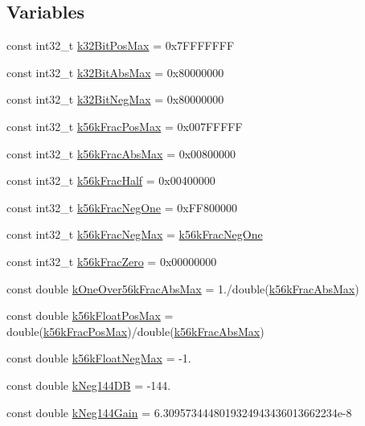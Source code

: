 \subsection*{Variables}
\begin{DoxyCompactItemize}
\item 
const int32\+\_\+t \hyperlink{a00181_a6758dcc7fe73efcefb9980ff895c36d0}{k32\+Bit\+Pos\+Max} = 0x7\+F\+F\+F\+F\+F\+F\+F
\item 
const int32\+\_\+t \hyperlink{a00181_a19c3de953254f182959cb74c9f6ed055}{k32\+Bit\+Abs\+Max} = 0x80000000
\item 
const int32\+\_\+t \hyperlink{a00181_a4623748ef4a22daea8cbbf7557ecb60e}{k32\+Bit\+Neg\+Max} = 0x80000000
\item 
const int32\+\_\+t \hyperlink{a00181_aa1f75eeb19dad78b3045cb5778421b61}{k56k\+Frac\+Pos\+Max} = 0x007\+F\+F\+F\+F\+F
\item 
const int32\+\_\+t \hyperlink{a00181_ad6054f9b9b26d0b3ee01a6ef097afaea}{k56k\+Frac\+Abs\+Max} = 0x00800000
\item 
const int32\+\_\+t \hyperlink{a00181_a485384e2f324b1666ad9d8600c442d61}{k56k\+Frac\+Half} = 0x00400000
\item 
const int32\+\_\+t \hyperlink{a00181_affbe56efc7321622e3d4c1e2ef60cb28}{k56k\+Frac\+Neg\+One} = 0x\+F\+F800000
\item 
const int32\+\_\+t \hyperlink{a00181_a3306ddeeab535815290a268837e276b1}{k56k\+Frac\+Neg\+Max} = \hyperlink{a00181_affbe56efc7321622e3d4c1e2ef60cb28}{k56k\+Frac\+Neg\+One}
\item 
const int32\+\_\+t \hyperlink{a00181_aeb01246d63cd5b5d1b6c6eb5bcd08b8b}{k56k\+Frac\+Zero} = 0x00000000
\item 
const double \hyperlink{a00181_a5ad86b72eda6b0e72864ec774adad1cf}{k\+One\+Over56k\+Frac\+Abs\+Max} = 1./double(\hyperlink{a00181_ad6054f9b9b26d0b3ee01a6ef097afaea}{k56k\+Frac\+Abs\+Max})
\item 
const double \hyperlink{a00181_abc7ad084f4b51c70feeac700ab05f7a5}{k56k\+Float\+Pos\+Max} = double(\hyperlink{a00181_aa1f75eeb19dad78b3045cb5778421b61}{k56k\+Frac\+Pos\+Max})/double(\hyperlink{a00181_ad6054f9b9b26d0b3ee01a6ef097afaea}{k56k\+Frac\+Abs\+Max})
\item 
const double \hyperlink{a00181_ae1518eaa8f13def92b4c9daeedbbe002}{k56k\+Float\+Neg\+Max} = -\/1.
\item 
const double \hyperlink{a00181_a2381bc3bc0a4c5e07bf67baf7d440137}{k\+Neg144\+D\+B} = -\/144.
\item 
const double \hyperlink{a00181_a1baf8195909ae1265cbb609e6702d2b4}{k\+Neg144\+Gain} = 6.\+3095734448019324943436013662234e-\/8
\end{DoxyCompactItemize}


